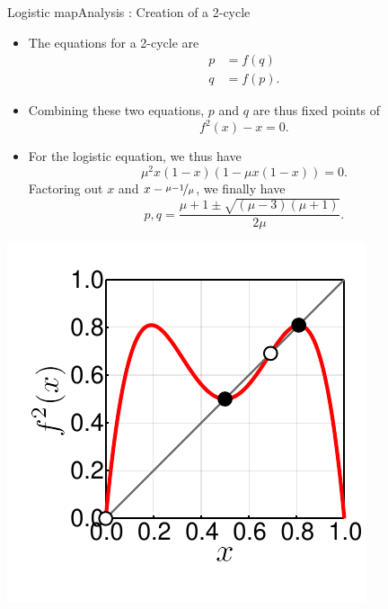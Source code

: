 \documentclass[usenames,dvipsnames,svgnames,10pt,aspectratio=169]{beamer}
\begin{document}
\begin{frame}[t, c]{Logistic map}{Analysis : Creation of a 2-cycle}
	\begin{minipage}{.68\textwidth}
		\begin{itemize}
			\item The equations for a 2-cycle are
			\[
				\begin{aligned}
					p & = f(q) \\
					q & = f(p).
				\end{aligned}
			\]

			\item Combining these two equations, \( p \) and \( q \) are thus fixed points of
			\[
				f^2(x) - x = 0.
			\]

			\item For the logistic equation, we thus have
			\[
				\mu^2 x \left( 1 - x \right) \left( 1 - \mu x \left( 1 - x \right) \right) = 0.
			\]
			Factoring out \( x \) and \( x - \nicefrac{\mu -1}{\mu} \), we finally have
			\[
				p, q = \frac{\mu + 1 \pm \sqrt{\left( \mu - 3 \right) \left( \mu + 1 \right)}}{2\mu}.
			\]
		\end{itemize}
	\end{minipage}%
	\hfill
	\begin{minipage}{.28\textwidth}
		\centering
		\includegraphics[width=\textwidth]{cycle_2_creation}
	\end{minipage}

	\vspace{1cm}
\end{frame}
\end{document}
